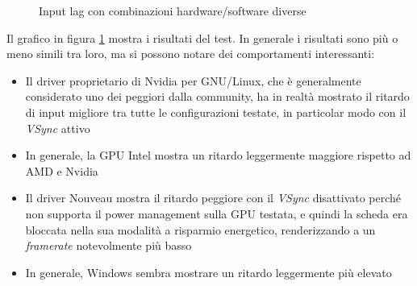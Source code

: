 \begin{figure}[h!]
	\centering
	\dataset
	\caption{Input lag con combinazioni hardware/software diverse}
	\label{fig:inputlag_os}
\end{figure}

Il grafico in figura \ref{fig:inputlag_os} mostra i risultati del test. In generale i risultati sono più o meno simili tra loro, ma si possono notare dei comportamenti interessanti:\begin{itemize}
	\item Il driver proprietario di Nvidia per GNU/Linux, che è generalmente considerato uno dei peggiori dalla community\cite{nvidia_linux}, ha in realtà mostrato il ritardo di input migliore tra tutte le configurazioni testate, in particolar modo con il \textit{VSync} attivo
	\item In generale, la GPU Intel mostra un ritardo leggermente maggiore rispetto ad AMD e Nvidia
	\item Il driver Nouveau mostra il ritardo peggiore con il \textit{VSync} disattivato perché non supporta il power management sulla GPU testata, e quindi la scheda era bloccata nella sua modalità a risparmio energetico, renderizzando a un \textit{framerate} notevolmente più basso
	\item In generale, Windows sembra mostrare un ritardo leggermente più elevato
\end{itemize}

